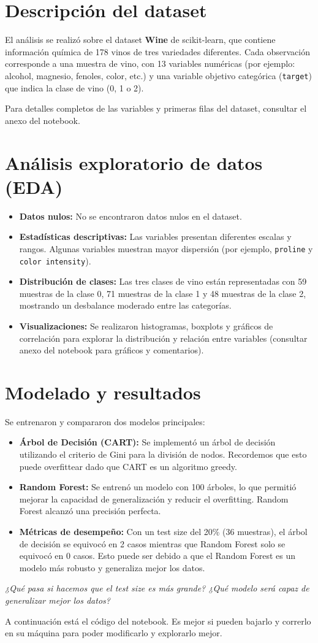 \documentclass[12pt]{article}
\begin{document}
\section{Descripción del dataset}
El análisis se realizó sobre el dataset \textbf{Wine} de scikit-learn, que contiene información química de 178 vinos de tres variedades diferentes. Cada observación corresponde a una muestra de vino, con 13 variables numéricas (por ejemplo: alcohol, magnesio, fenoles, color, etc.) y una variable objetivo categórica (\texttt{target}) que indica la clase de vino (0, 1 o 2).

\vspace{0.5em}
Para detalles completos de las variables y primeras filas del dataset, consultar el anexo del notebook.

\section{Análisis exploratorio de datos (EDA)}
\begin{itemize}
    \item \textbf{Datos nulos:} No se encontraron datos nulos en el dataset.
    \item \textbf{Estadísticas descriptivas:} Las variables presentan diferentes escalas y rangos. Algunas variables muestran mayor dispersión (por ejemplo, \texttt{proline} y \texttt{color intensity}).
    \item \textbf{Distribución de clases:} Las tres clases de vino están representadas con 59 muestras de la clase 0, 71 muestras de la clase 1 y 48 muestras de la clase 2, mostrando un desbalance moderado entre las categorías.
    \item \textbf{Visualizaciones:} Se realizaron histogramas, boxplots y gráficos de correlación para explorar la distribución y relación entre variables (consultar anexo del notebook para gráficos y comentarios).
\end{itemize}

\section{Modelado y resultados}
Se entrenaron y compararon dos modelos principales:
\begin{itemize}
    \item \textbf{Árbol de Decisión (CART):} Se implementó un árbol de decisión utilizando el criterio de Gini para la división de nodos. Recordemos que esto puede overfittear dado que CART es un algoritmo greedy.
    \item \textbf{Random Forest:} Se entrenó un modelo con 100 árboles, lo que permitió mejorar la capacidad de generalización y reducir el overfitting. Random Forest alcanzó una precisión perfecta.
    \item \textbf{Métricas de desempeño:} Con un test size del 20\% (36 muestras), el árbol de decisión se equivocó en 2 casos mientras que Random Forest solo se equivocó en 0 casos. Esto puede ser debido a que el Random Forest es un modelo más robusto y generaliza mejor los datos.
\end{itemize}

\textit{¿Qué pasa si hacemos que el test size es más grande? ¿Qué modelo será capaz de generalizar mejor los datos?}

\vspace{1em}

A continuación está el código del notebook. Es mejor si pueden bajarlo y correrlo en su máquina para poder modificarlo y explorarlo mejor.
\end{document}
